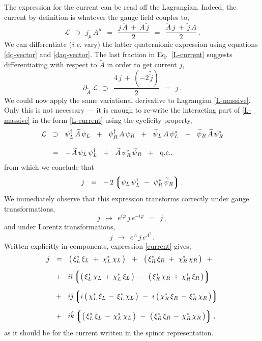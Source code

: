\documentclass[epsfig,12pt]{article}
\newcommand{\cell}{{\mathcal L}}
\newcommand{\p}{\partial}
\newcommand{\wt}{\widetilde}
\newcommand{\lgr}{\left\lgroup}
\newcommand{\rgr}{\right\rgroup}
\newcommand{\ii}{\hat\imath}
\newcommand{\jj}{\hat\jmath}
\newcommand{\kk}{\hat k}
\begin{document}
	The expression for the current can be read off the Lagrangian.
	Indeed, the current by definition is whatever the gauge field couples to,
\begin{equation}
\label{L-current}
	\cell	~~\supset~~	j_\mu\, A^\mu	
		~~=~~	\frac{j\,\wt A ~+~ A\,\wt j } 2
		~~=~~	\frac{\wt A\, j  ~+~  \wt j\, A} 2\,.
\end{equation}
	We can differentiate (\emph{i.e.} vary) the latter quaternionic expression using equations
	\eqref{dq-vector} and \eqref{daq-vector}.
	The last fraction in Eq.~\eqref{L-current} suggests differentiating with respect to $ \wt A $ in order
	to get current $ j $,
\begin{equation}
	\p_{\wt A}\, \cell	~~\supset~~	\frac { 4\,j ~+~ (-2\,\wt{\wt j}) } 2
	~~=~~
	j\,.
\end{equation}
	We could now apply the same variational derivative to Lagrangian \eqref{L-massive}.
	Only this is not necessary --- it is enough to re-write the interacting part of
	\eqref{L-massive} in the form \eqref{L-current} using the cyclicity property,
\begin{align}
%
\notag
	\cell	& ~~\supset~~	\psi_L^\dag\, \wt A\, \psi_L  ~~+~~  \psi_R^\dag\, A\, \psi_R  ~~+~~
				\wt{\psi}{}_L\, A\, \psi_L^*  ~~-~~  \wt{\psi}{}_R\, \wt A\, \psi_R^*
	\\[3mm]
%
	& ~~=~~
	-\, \wt A\, \psi_L\,\psi_L^\dag  ~~+~~ \wt A\, \psi_R^*\,\wt{\psi}{}_R  ~~+~~  \text{q.c.},
\end{align}
	from which we conclude that
\begin{equation}
\label{current}
	j	~~=~~	-\,2 \lgr \psi_L\,\psi_L^\dag  ~-~  \psi_R^*\,\wt\psi{}_R \rgr.
\end{equation}
	We immediately observe that this expression transforms correctly under gauge transformations,
\begin{equation}
	j	~~\rightarrow~~	e^{i\varphi}\,j\,e^{-i\varphi}	~~=~~	j\,,
\end{equation}
	and under Lorentz transformations,
\begin{equation}
	j	~~\rightarrow~~	e^\Lambda\,j\,e^{\Lambda^\dag}\,.
\end{equation}
	Written explicitly in components, expression \eqref{current} gives,
\begin{align}
%
\notag
	j	&  ~~=~~			\big(\, \xi_L^*\,\xi_L ~+~ \chi_L^*\,\chi_L \,\big)  ~~+~~  
						\big(\, \xi_R^*\,\xi_R ~+~ \chi_R^*\,\chi_R \,\big)  ~~+~~
	\\[2mm]
%
\notag
		& ~~+~~		i\ii \lgr	\big(\, \xi_L^*\,\chi_L \,+\, \chi_L^*\,\xi_L \,\big) ~-~
						\big(\, \xi_R^*\,\chi_R \,+\, \chi_R^*\,\xi_R \,\big) \rgr
	\\[2mm]
%
		& ~~+~~		i\jj \lgr	i\,\big(\, \chi_L^*\,\xi_L \,-\, \xi_L^*\,\chi_L \,\big) ~-~
						i\,\big(\, \chi_R^*\,\xi_R \,-\, \xi_R^*\,\chi_R \,\big) \rgr
	\\[2mm]
%
		& ~~+~~		i\kk \lgr	\big(\, \xi_L^*\,\xi_L \,-\, \chi_L^*\,\chi_L \,\big) ~-~
						\big(\, \xi_R^*\,\xi_R \,-\, \chi_R^*\,\chi_R \,\big) \rgr,
\notag
\end{align}
	as it should be for the current written in the spinor representation.
\end{document}

